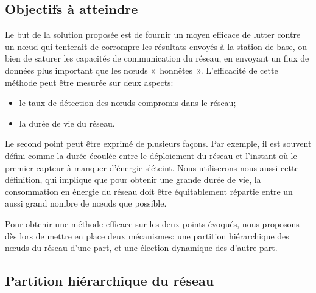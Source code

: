     \subsection{Objectifs à atteindre}

Le but de la solution proposée est de fournir un moyen efficace de lutter contre un nœud qui tenterait de corrompre les résultats envoyés à la station de base, ou bien de saturer les capacités de communication du réseau, en envoyant un flux de données plus important que les nœuds «~honnêtes~».
L'efficacité de cette méthode peut être mesurée sur deux aspects:
\begin{itemize}
    \item le taux de détection des nœuds compromis dans le réseau;
    \item la durée de vie du réseau.
\end{itemize}
Le second point peut être exprimé de plusieurs façons.
Par exemple, il est souvent défini comme la durée écoulée entre le déploiement du réseau et l'instant où le premier capteur à manquer d'énergie s'éteint.
Nous utiliserons nous aussi cette définition, qui implique que pour obtenir une grande durée de vie, la consommation en énergie du réseau doit être équitablement répartie entre un aussi grand nombre de nœuds que possible.

Pour obtenir une méthode efficace sur les deux points évoqués, nous proposons dès lors de mettre en place deux mécanismes: une partition hiérarchique des nœuds du réseau d'une part, et une élection dynamique des \cns d'autre part.

    \subsection{Partition hiérarchique du réseau}

